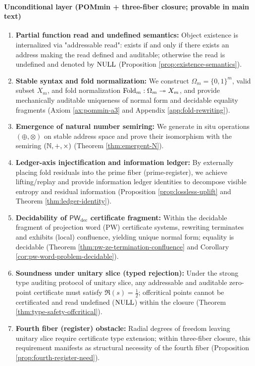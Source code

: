 \paragraph{Unconditional layer (POMmin + three-fiber closure; provable in main text)}
\begin{enumerate}
  \item \textbf{Partial function read and undefined semantics:} Object existence is internalized via "addressable read": exists if and only if there exists an address making the read defined and auditable; otherwise the read is undefined and denoted by $\mathrm{NULL}$ (Proposition \ref{prop:existence-semantics}).\par
  \item \textbf{Stable syntax and fold normalization:} We construct $\Omega_m=\{0,1\}^m$, valid subset $X_m$, and fold normalization $\mathrm{Fold}_m:\Omega_m\twoheadrightarrow X_m$, and provide mechanically auditable uniqueness of normal form and decidable equality fragments (Axiom \ref{ax:pommin-a3} and Appendix \ref{app:fold-rewriting}).\par
  \item \textbf{Emergence of natural number semiring:} We generate in situ operations $(\oplus,\otimes)$ on stable address space and prove their isomorphism with the semiring $(\mathbb{N},+,\times)$ (Theorem \ref{thm:emergent-N}).\par
  \item \textbf{Ledger-axis injectification and information ledger:} By externally placing fold residuals into the prime fiber (prime-register), we achieve lifting/replay and provide information ledger identities to decompose visible entropy and residual information (Proposition \ref{prop:lossless-uplift} and Theorem \ref{thm:ledger-identity}).\par
  \item \textbf{Decidability of $\mathsf{PW}_{\mathrm{dec}}$ certificate fragment:} Within the decidable fragment of projection word (PW) certificate systems, rewriting terminates and exhibits (local) confluence, yielding unique normal form; equality is decidable (Theorem \ref{thm:pw-ze-termination-confluence} and Corollary \ref{cor:pw-word-problem-decidable}).\par
  \item \textbf{Soundness under unitary slice (typed rejection):} Under the strong type auditing protocol of unitary slice, any addressable and auditable zero-point certificate must satisfy $\Re(s)=\tfrac12$; offcritical points cannot be certificated and read undefined ($\mathrm{NULL}$) within the closure (Theorem \ref{thm:type-safety-offcritical}).\par
  \item \textbf{Fourth fiber (register) obstacle:} Radial degrees of freedom leaving unitary slice require certificate type extension; within three-fiber closure, this requirement manifests as structural necessity of the fourth fiber (Proposition \ref{prop:fourth-register-need}).\par
\end{enumerate}


